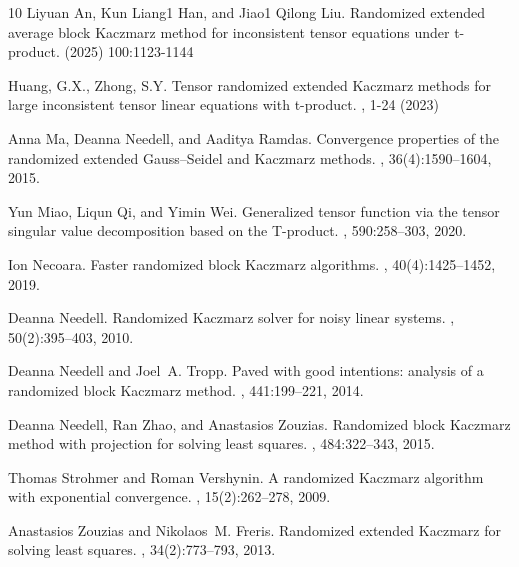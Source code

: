 \documentclass[11pt]{article}
\begin{document}
{\begin{thebibliography}{10}
Liyuan An, Kun Liang1 Han, and Jiao1 Qilong Liu.
\newblock Randomized extended average block Kaczmarz method
for inconsistent tensor equations under t-product.
 (2025) 100:1123-1144

 Huang, G.X., Zhong, S.Y.
\newblock Tensor randomized extended Kaczmarz methods for large inconsistent
tensor linear equations with t-product. 
, 1-24 (2023)


Anna Ma, Deanna Needell, and Aaditya Ramdas.
\newblock Convergence properties of the randomized extended {G}auss--{S}eidel
  and {K}aczmarz methods.
, 36(4):1590--1604, 2015.

Yun Miao, Liqun Qi, and Yimin Wei.
\newblock Generalized tensor function via the tensor singular value
  decomposition based on the {T}-product.
, 590:258--303, 2020.




Ion Necoara.
\newblock Faster randomized block {K}aczmarz algorithms.
, 40(4):1425--1452, 2019.

Deanna Needell.
\newblock Randomized {K}aczmarz solver for noisy linear systems.
, 50(2):395--403, 2010.

Deanna Needell and Joel~A. Tropp.
\newblock Paved with good intentions: analysis of a randomized block {K}aczmarz
  method.
, 441:199--221, 2014.

Deanna Needell, Ran Zhao, and Anastasios Zouzias.
\newblock Randomized block {K}aczmarz method with projection for solving least
  squares.
, 484:322--343, 2015.


Thomas Strohmer and Roman Vershynin.
\newblock A randomized {K}aczmarz algorithm with exponential convergence.
, 15(2):262--278, 2009.

Anastasios Zouzias and Nikolaos~M. Freris.
\newblock Randomized extended {K}aczmarz for solving least squares.
, 34(2):773--793, 2013.


\end{thebibliography}}
\end{document}
